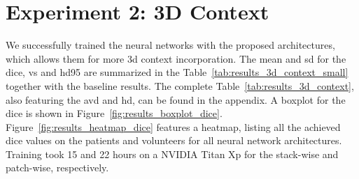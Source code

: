 \section{Experiment 2: 3D Context} \label{sec:exp_3dcontext} %
We successfully trained the neural networks with the proposed architectures, which allows them for more \gls{3d} context incorporation. The mean and \gls{sd} for the \acrlong{dice}, \acrlong{vs} and \acrlong{hd95} are summarized in the Table~\ref{tab:results_3d_context_small} together with the baseline results. The complete Table~\ref{tab:results_3d_context}, also featuring the \acrlong{avd} and \acrlong{hd}, can be found in the appendix. A boxplot for the \acrlong{dice} is shown in Figure~\ref{fig:results_boxplot_dice}. Figure~\ref{fig:results_heatmap_dice} features a heatmap, listing all the achieved \acrlong{dice} values on the patients and volunteers for all neural network architectures. Training took 15 and 22 hours on a NVIDIA Titan Xp for the stack-wise and patch-wise, respectively.

